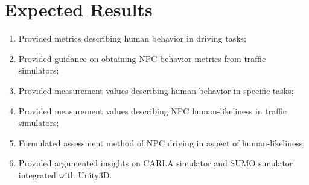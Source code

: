 \documentclass{VUMIFPS-master-intro}
\begin{document}


\section{Expected Results}

%

\begin{enumerate}
	\item Provided metrics describing human behavior in driving tasks;
	\item Provided guidance on obtaining NPC behavior metrics from traffic simulators;
	\item Provided measurement values describing human behavior in specific tasks;
	\item Provided measurement values describing NPC human-likeliness in traffic simulators;
	\item Formulated assessment method of NPC driving in aspect of human-likeliness;
	\item Provided argumented insights on CARLA simulator and SUMO simulator integrated with Unity3D.
\end{enumerate}









\printbibliography[heading=bibintoc]




\end{document}
